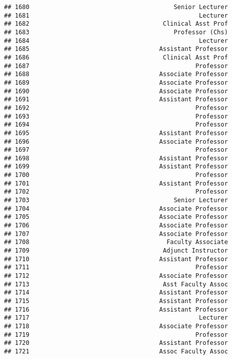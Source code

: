 \documentclass[
]{article}
\begin{document}
\begin{verbatim}
## 1680                                        Senior Lecturer
## 1681                                               Lecturer
## 1682                                     Clinical Asst Prof
## 1683                                        Professor (Chs)
## 1684                                               Lecturer
## 1685                                    Assistant Professor
## 1686                                     Clinical Asst Prof
## 1687                                              Professor
## 1688                                    Associate Professor
## 1689                                    Associate Professor
## 1690                                    Associate Professor
## 1691                                    Assistant Professor
## 1692                                              Professor
## 1693                                              Professor
## 1694                                              Professor
## 1695                                    Assistant Professor
## 1696                                    Associate Professor
## 1697                                              Professor
## 1698                                    Assistant Professor
## 1699                                    Assistant Professor
## 1700                                              Professor
## 1701                                    Assistant Professor
## 1702                                              Professor
## 1703                                        Senior Lecturer
## 1704                                    Associate Professor
## 1705                                    Associate Professor
## 1706                                    Associate Professor
## 1707                                    Associate Professor
## 1708                                      Faculty Associate
## 1709                                     Adjunct Instructor
## 1710                                    Assistant Professor
## 1711                                              Professor
## 1712                                    Associate Professor
## 1713                                     Asst Faculty Assoc
## 1714                                    Assistant Professor
## 1715                                    Assistant Professor
## 1716                                    Assistant Professor
## 1717                                               Lecturer
## 1718                                    Associate Professor
## 1719                                              Professor
## 1720                                    Assistant Professor
## 1721                                    Assoc Faculty Assoc

\end{verbatim}
\end{document}
